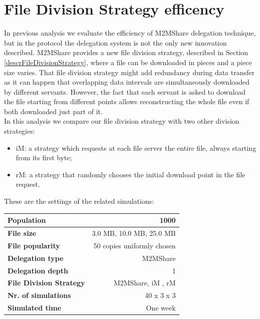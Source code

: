 \section{File Division Strategy efficency}
In previous analysis we evaluate the efficiency of M2MShare delegation technique, but in the protocol the delegation system is not the only new innovation described. M2MShare provides a new file division strategy, described in Section \ref{descrFileDivisionStrategy}, where a file can be downloaded in pieces and a piece size varies. That file division strategy might add redundancy during data transfer as it can happen that overlapping data intervals are simultaneously downloaded by different servants. However, the fact that each servant is asked to download the file starting from different points allows reconstructing the whole file even if both downloaded just part of it. \\
In this analysis we compare our file division strategy with two other division strategies:
\begin{itemize}
\item iM: a strategy which requests at each file server the
entire file, always starting from its first byte;
\item rM: a strategy that randomly chooses the initial
download point in the file request.
\end{itemize}
These are the settings of the related simulations:
\begin{table}[h]
\begin{center}
\begin{tabular}{|l|r|}
\hline
\bfseries Population & 1000 \\
\hline
\bfseries File size & 3.0 MB, 10.0 MB, 25.0 MB \\
\hline
\bfseries File popularity & 50 copies uniformly chosen \\
\hline
\bfseries Delegation type & M2MShare \\
\hline
\bfseries Delegation depth & 1 \\
\hline
\bfseries File Division Strategy & M2MShare, iM , rM \\
\hline
\bfseries Nr. of simulations & 40 x 3 x 3\\
\hline
\bfseries Simulated time & One week \\
\hline
\end{tabular}
\end{center}
\end{table}


